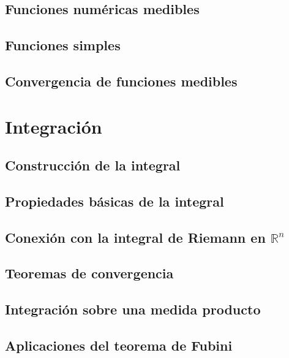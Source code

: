 \documentclass[12pt,]{krantz}
\theoremstyle{definition}
\theoremstyle{definition}
\theoremstyle{definition}
\theoremstyle{remark}
\begin{document}
\section{Funciones numéricas
medibles}\label{funciones-numericas-medibles}

\section{Funciones simples}\label{funciones-simples}

\section{Convergencia de funciones
medibles}\label{convergencia-de-funciones-medibles}

\chapter{Integración}\label{integracion-1}

\section{Construcción de la integral}\label{construccion-de-la-integral}

\section{Propiedades básicas de la
integral}\label{propiedades-basicas-de-la-integral}

\section{\texorpdfstring{Conexión con la integral de Riemann en
\(\mathbb{R}^n\)}{Conexión con la integral de Riemann en \textbackslash{}mathbb\{R\}\^{}n}}\label{conexion-con-la-integral-de-riemann-en-mathbbrn}

\section{Teoremas de convergencia}\label{teoremas-de-convergencia}

\section{Integración sobre una medida
producto}\label{integracion-sobre-una-medida-producto}

\section{Aplicaciones del teorema de
Fubini}\label{aplicaciones-del-teorema-de-fubini}
\end{document}
